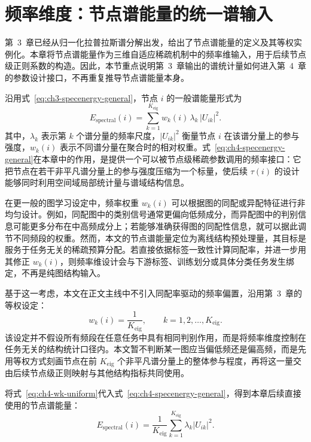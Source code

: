 \section{频率维度：节点谱能量的统一谱输入}
\label{sec:ch4-freq}
\label{idx:theme:espectral}

第~3~章已经从归一化拉普拉斯谱分解出发，给出了节点谱能量的定义及其等权实例化。本章将节点谱能量作为三维自适应稀疏机制中的频率维输入，用于后续节点级正则系数的构造。因此，本节重点说明第~3~章输出的谱统计量如何进入第~4~章的参数设计接口，不再重复推导节点谱能量本身。

沿用式~\eqref{eq:ch3-specenergy-general}，节点 \(i\) 的一般谱能量形式为
\begin{equation}
  E_{\text{spectral}}(i)
  = \sum_{k=1}^{K_{\text{eig}}} w_k(i)\,\lambda_k\,|U_{ik}|^2.
  \label{eq:ch4-specenergy-general}
\end{equation}
其中，\(\lambda_k\) 表示第 \(k\) 个谱分量的频率尺度，\(|U_{ik}|^2\) 衡量节点 \(i\) 在该谱分量上的参与强度，\(w_k(i)\) 表示不同谱分量在聚合时的相对权重。式~\eqref{eq:ch4-specenergy-general}在本章中的作用，是提供一个可以被节点级稀疏参数调用的频率接口：它把节点在若干非平凡谱分量上的参与强度压缩为一个标量，使后续 \(\tau(i)\) 的设计能够同时利用空间域局部统计量与谱域结构信息。

在更一般的图学习设定中，频率权重 \(w_k(i)\) 可以根据图的同配或异配特征进行非均匀设计。例如，同配图中的类别信号通常更偏向低频成分，而异配图中的判别信息可能更多分布在中高频成分上；若能够准确获得图的同配性信息，就可以据此调节不同频段的权重。然而，本文的节点谱能量定位为离线结构预处理量，其目标是服务于任务无关的稀疏预算分配。若直接依据标签一致性计算同配率，并进一步用其修正 \(w_k(i)\)，则频率维设计会与下游标签、训练划分或具体分类任务发生绑定，不再是纯图结构输入。

基于这一考虑，本文在正文主线中不引入同配率驱动的频率偏置，沿用第~3~章的等权设定：
\begin{equation}
  w_k(i)=\frac{1}{K_{\text{eig}}}, \qquad k=1,2,\dots,K_{\text{eig}}.
  \label{eq:ch4-wk-uniform}
\end{equation}
该设定并不假设所有频段在任意任务中具有相同判别作用，而是将频率维度控制在任务无关的结构统计口径内。本文暂不判断某一图应当偏低频还是偏高频，而是先用等权方式刻画节点在前 \(K_{\text{eig}}\) 个非平凡谱分量上的整体参与程度，再将这一量交由后续节点级正则映射与其他结构指标共同使用。

将式~\eqref{eq:ch4-wk-uniform}代入式~\eqref{eq:ch4-specenergy-general}，得到本章后续直接使用的节点谱能量：
\begin{equation}
  E_{\text{spectral}}(i)
  = \frac{1}{K_{\text{eig}}}\sum_{k=1}^{K_{\text{eig}}}\lambda_k |U_{ik}|^2.
  \label{eq:ch4-specenergy}
\end{equation}

